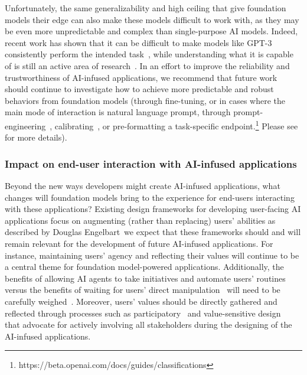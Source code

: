 Unfortunately, the same generalizability and high ceiling that give foundation models their edge can also make these models difficult to work with, as they may be even more unpredictable and complex than single-purpose AI models. Indeed, recent work has shown that it can be difficult to make models like GPT-3 consistently perform the intended task~\citep{Reynolds2021prompt}, while understanding what it is capable of is still an active area of research~\citep{Hendrycks2020Measuring}. In an effort to improve the reliability and trustworthiness of AI-infused applications, we recommend that future work should continue to investigate how to achieve more predictable and robust behaviors from foundation models (\eg through fine-tuning, or in cases where the main mode of interaction is natural language prompt, through prompt-engineering~\citep{Reynolds2021prompt, Liu2021incontext}, calibrating~\citep{Zhao2021calibrate}, or pre-formatting a task-specific endpoint.\footnote{https://beta.openai.com/docs/guides/classifications} Please see  for more details). 

\subsubsection{Impact on end-user interaction with AI-infused applications} 
\label{sec:interaction-userimpact}
Beyond the new ways developers might create AI-infused applications, what changes will foundation models bring to the experience for end-users interacting with these applications? Existing design frameworks for developing user-facing AI applications focus on augmenting (rather than replacing) users' abilities as described by Douglas Engelbart~\citep{Engelbart1963augment}\dash{}we expect that these frameworks should and will remain relevant for the development of future AI-infused applications. For instance, maintaining users' agency and reflecting their values will continue to be a central theme for foundation model-powered applications. Additionally, the benefits of allowing AI agents to take initiatives and automate users' routines versus the benefits of waiting for users' direct manipulation~\citep{Shneiderman1997direct} will need to be carefully weighed~\citep{Horvitz1999mixedinit}. Moreover, users' values should be directly gathered and reflected through processes such as participatory~\citep{Lee2019} and value-sensitive design~\citep{smith2020keeping} that advocate for actively involving all stakeholders during the designing of the AI-infused applications. 

